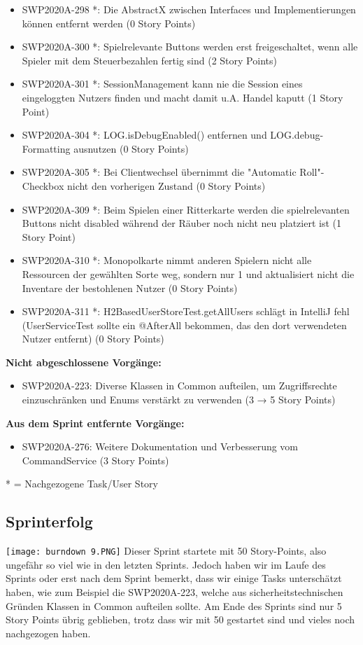 \documentclass[12pt,a4paper, oneside]{article}
\begin{document}
\begin{itemize}
\item SWP2020A-298 *:	Die AbstractX zwischen Interfaces und Implementierungen können entfernt werden (0 Story Points)
\item SWP2020A-300 *:	Spielrelevante Buttons werden erst freigeschaltet, wenn alle Spieler mit dem Steuerbezahlen fertig sind (2 Story Points)
\item SWP2020A-301 *:	SessionManagement kann nie die Session eines eingeloggten Nutzers finden und macht damit u.A. Handel kaputt  (1 Story Point)
\item SWP2020A-304 *:	LOG.isDebugEnabled() entfernen und LOG.debug-Formatting ausnutzen (0 Story Points)
\item SWP2020A-305 *:	Bei Clientwechsel übernimmt die "Automatic Roll"-Checkbox nicht den vorherigen Zustand (0 Story Points)
\item SWP2020A-309 *:	Beim Spielen einer Ritterkarte werden die spielrelevanten Buttons nicht disabled während der Räuber noch nicht neu platziert ist (1 Story Point)
\item SWP2020A-310 *:	Monopolkarte nimmt anderen Spielern nicht alle Ressourcen der gewählten Sorte weg, sondern nur 1 und aktualisiert nicht die Inventare der bestohlenen Nutzer (0 Story Points)
\item SWP2020A-311 *:	H2BasedUserStoreTest.getAllUsers schlägt in IntelliJ fehl (UserServiceTest sollte ein @AfterAll bekommen, das den dort verwendeten Nutzer entfernt) (0 Story Points)
\end{itemize}

\textbf{Nicht abgeschlossene Vorgänge:}
\begin{itemize}
\item SWP2020A-223:	Diverse Klassen in Common 		 aufteilen, um Zugriffsrechte einzuschränken und Enums verstärkt zu verwenden (3 → 5 Story Points)
\end{itemize}

\textbf{Aus dem Sprint entfernte Vorgänge:}
\begin{itemize}
\item SWP2020A-276:	Weitere Dokumentation und Verbesserung vom CommandService (3 Story Points)
\end{itemize}


* = Nachgezogene Task/User Story




\subsection{Sprinterfolg}
\texttt{[image: burndown 9.PNG]}
Dieser Sprint startete mit 50 Story-Points, also ungefähr so viel wie in den letzten Sprints. Jedoch haben wir im Laufe des Sprints oder erst nach dem Sprint bemerkt, dass wir einige Tasks unterschätzt haben, wie zum Beispiel die SWP2020A-223, welche aus sicherheitstechnischen Gründen Klassen in Common aufteilen sollte. Am Ende des Sprints sind nur 5 Story Points übrig geblieben, trotz dass wir mit 50 gestartet sind und vieles noch nachgezogen haben.
\end{document}
